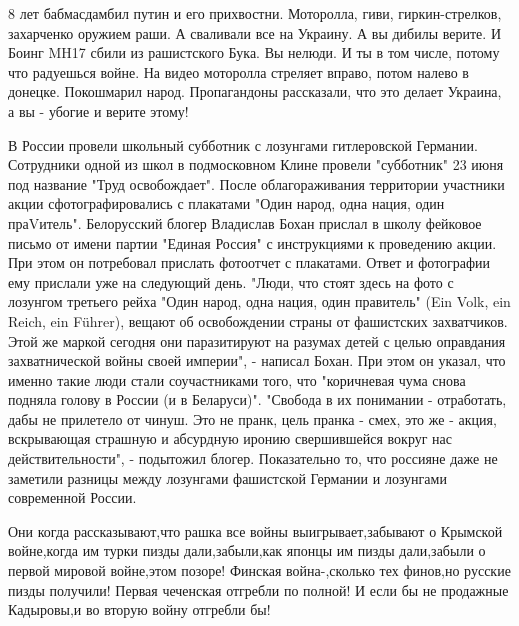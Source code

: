 8 лет бабмасдамбил путин и его прихвостни. Моторолла, гиви, гиркин-стрелков,
захарченко оружием раши. А сваливали все на Украину. А вы дибилы верите. И
Боинг MH17 сбили из рашистского Бука. Вы нелюди. И ты в том числе, потому что
радуешься войне.  На видео моторолла стреляет вправо, потом налево в донецке.
Покошмарил народ. Пропагандоны рассказали, что это делает Украина, а вы -
убогие и верите этому!

В России провели школьный субботник с лозунгами гитлеровской Германии.
Сотрудники одной из школ в подмосковном Клине провели "субботник" 23 июня под
название "Труд освобождает". После облагораживания территории участники акции
сфотографировались с плакатами "Один народ, одна нация, один праVитель".
Белорусский блогер Владислав Бохан прислал в школу фейковое письмо от имени
партии "Единая Россия" с инструкциями к проведению акции. При этом он
потребовал прислать фотоотчет с плакатами. Ответ и фотографии ему прислали уже
на следующий день. "Люди, что стоят здесь на фото с лозунгом третьего рейха
"Один народ, одна нация, один правитель" (Ein Volk, ein Reich, ein Führer),
вещают об освобождении страны от фашистских захватчиков. Этой же маркой сегодня
они паразитируют на разумах детей с целью оправдания захватнической войны своей
империи", - написал Бохан. При этом он указал, что именно такие люди стали
соучастниками того, что "коричневая чума снова подняла голову в России (и в
Беларуси)". "Свобода в их понимании - отработать, дабы не прилетело от чинуш.
Это не пранк, цель пранка - смех, это же - акция, вскрывающая страшную и
абсурдную иронию свершившейся вокруг нас действительности", - подытожил блогер.
Показательно то, что россияне даже не заметили разницы между лозунгами
фашистской Германии и лозунгами современной России.

Они когда рассказывают,что рашка все войны выигрывает,забывают о Крымской
войне,когда им турки пизды дали,забыли,как японцы им пизды дали,забыли о первой
мировой войне,этом позоре! Финская война-,сколько тех финов,но русские пизды
получили! Первая чеченская отгребли по полной! И если бы не продажные
Кадыровы,и во вторую войну отгребли бы!
